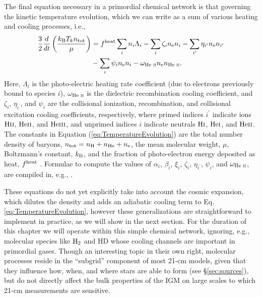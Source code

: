 The final equation necessary in a primordial chemical network is that governing the kinetic temperature evolution, which we can write as a sum of various heating and cooling processes, i.e.,
\begin{align}
    \frac{3}{2}\frac{d}{dt}\left(\frac{k_{\text{B}} T_k n_{\text{tot}}}{\mu}\right) & = f^{\text{heat}}  \sum_i n_i \Lambda_i - \sum_i \zeta_i n_{\text{e}} n_i - \sum_{i^{\prime}} \eta_{i^{\prime}} n_{\text{e}} n_{i^{\prime}} \nonumber \\ & - \sum_i \psi_i n_{\text{e}} n_i - \omega_{\text{He } \textsc{ii}} n_{\text{e}} n_{\text{He } \textsc{ii}} \label{eq:TemperatureEvolution} .
\end{align}
Here, $\Lambda_i$ is the photo-electric heating rate coefficient (due to
electrons previously bound to species $i$), $\omega_{\text{He } \textsc{ii}}$ is the dielectric
recombination cooling coefficient, and $\zeta_i$, $\eta_{i^{\prime}}$, and
$\psi_i$ are the collisional ionization, recombination, and collisional
excitation cooling coefficients, respectively, where primed indices
$i^{\prime}$ indicate ions $\text{H} {\textsc{ii}}$, $\text{He} {\textsc{ii}}$, and $\text{He} {\textsc{iii}}$, and unprimed
indices $i$ indicate neutrals $\text{H} {\textsc{i}}$, $\text{He} {\textsc{i}}$, and $\text{He} {\textsc{ii}}$. The constants in
Equation (\ref{eq:TemperatureEvolution}) are the total number density of
baryons, $n_{\text{tot}} = n_\mathrm{H} + n_{\mathrm{He}} + n_{\text{e}}$, the mean molecular
weight, $\mu$, Boltzmann's constant, $k_{\text{B}}$, and the fraction of photo-electron energy deposited as heat, $f^{\text{heat}}$ \cite{Shull1985,Furlanetto2010}. Formulae to compute the values of
$\alpha_i$, $\beta_i$, $\xi_i$, $\zeta_i$, $\eta_{i^{\prime}}$, $\psi_i$, and
$\omega_{\text{He } \textsc{ii}}$, are compiled in, e.g., \cite{Fukugita1994,Hui1997}.

These equations do not yet explicitly take into account the cosmic expansion, which dilutes the density and adds an adiabatic cooling term to Eq. \ref{eq:TemperatureEvolution}, however these generalizations are straightforward to implement in practice, as we will show in the next section. For the duration of this chapter we will operate within this simple chemical network, ignoring, e.g., molecular species like $\text{H}_2$ and $\mathrm{HD}$ whose cooling channels are important in primordial gases. Though an interesting topic in their own right, molecular processes reside in the ``subgrid'' component of most 21-cm models, given that they influence how, when, and where stars are able to form (see \S\ref{sec:sources}), but do not directly affect the bulk properties of the IGM on large scales to which 21-cm measurements are sensitive. 


